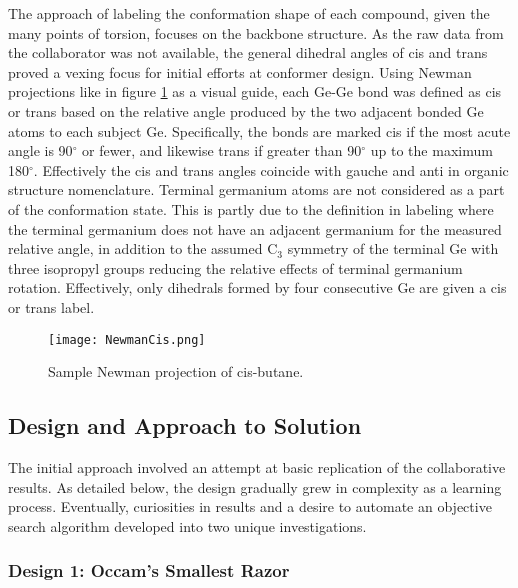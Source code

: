 The approach of labeling the conformation shape of each compound, given the many points of torsion, focuses on the backbone structure. 
As the raw data from the collaborator was not available, the general dihedral angles of cis and trans proved a vexing focus for initial efforts at conformer design.
Using Newman projections like in figure \ref{fig:Newman} as a visual guide, each Ge-Ge bond was defined as cis or trans based on the relative angle produced by the two  adjacent bonded Ge atoms to each subject Ge.
Specifically, the bonds are marked cis if the most acute angle is 90$^{\circ}$ or fewer, and likewise trans if greater than 90$^{\circ}$ up to the maximum 180$^{\circ}$.
Effectively the cis and trans angles coincide with gauche and anti in organic structure nomenclature.
Terminal germanium atoms are not considered as a part of the conformation state. 
This is partly due to the definition in labeling where the terminal germanium does not have an adjacent germanium for the measured relative angle, in addition to the assumed 
C$_{3}$
symmetry of the terminal Ge with three isopropyl groups reducing the relative effects of terminal germanium rotation.
Effectively, only dihedrals formed by four consecutive Ge are given a cis or trans label.

\begin{figure}
	
	\centering
	
	\texttt{[image: NewmanCis.png]}
	
	\caption{Sample Newman projection of cis-butane.}
	
	\label{fig:Newman}
	
\end{figure}

\subsection{Design and Approach to Solution}

The initial approach involved an attempt at basic replication of the collaborative results.
As detailed below, the design gradually grew in complexity as a learning process. 
Eventually, curiosities in results and a desire to automate an objective search algorithm developed into two unique investigations.

\subsubsection{Design 1: Occam's Smallest Razor}


